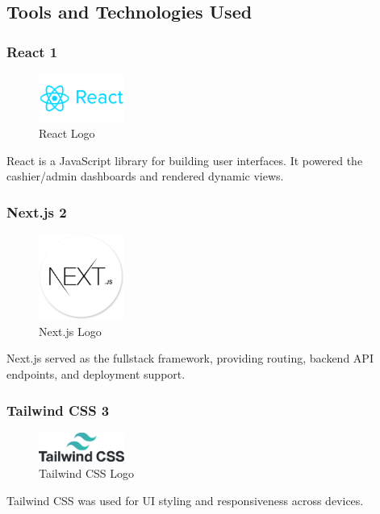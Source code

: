 \subsection{Tools and Technologies Used}

\subsubsection*{React {1}}
\begin{figure}[H]
  \centering
  \includegraphics[width=0.25\textwidth]{figures/logos/react-logo.png}
  \caption{React Logo}
\end{figure}
React is a JavaScript library for building user interfaces. It powered the cashier/admin dashboards and rendered dynamic views.

\subsubsection*{Next.js {2}}
\begin{figure}[H]
  \centering
  \includegraphics[width=0.25\textwidth]{figures/logos/nextjs-logo.png}
  \caption{Next.js Logo}
\end{figure}
Next.js served as the fullstack framework, providing routing, backend API endpoints, and deployment support.

\subsubsection*{Tailwind CSS {3}}
\begin{figure}[H]
  \centering
  \includegraphics[width=0.25\textwidth]{figures/logos/tailwind-logo.png}
  \caption{Tailwind CSS Logo}
\end{figure}
Tailwind CSS was used for UI styling and responsiveness across devices.

